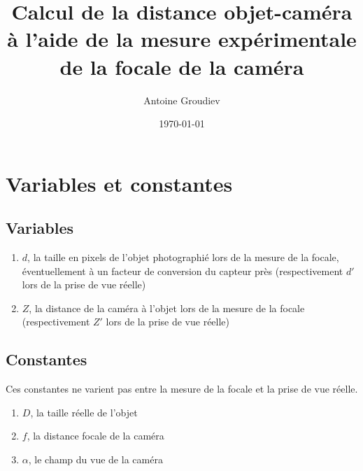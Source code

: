 \documentclass[12pt,a4paper]{article}
\author{Antoine Groudiev}
\title{Calcul de la distance objet-caméra à l'aide de la mesure expérimentale de la focale de la caméra}
\date{\today}
\begin{document}
\maketitle

\section{Variables et constantes}
\subsection{Variables}
    \begin{enumerate}
        \item $d$, la taille en pixels de l'objet photographié lors de la mesure de la focale, éventuellement à un facteur de conversion du capteur près (respectivement $d'$ lors de la prise de vue réelle)
        \item $Z$, la distance de la caméra à l'objet lors de la mesure de la focale (respectivement $Z'$ lors de la prise de vue réelle)
    \end{enumerate}
    
    \subsection{Constantes}
    Ces constantes ne varient pas entre la mesure de la focale et la prise de vue réelle.
    \begin{enumerate}
        \item $D$, la taille réelle de l'objet
        \item $f$, la distance focale de la caméra
        \item $\alpha$, le champ du vue de la caméra
    \end{enumerate}
    
\end{document}
